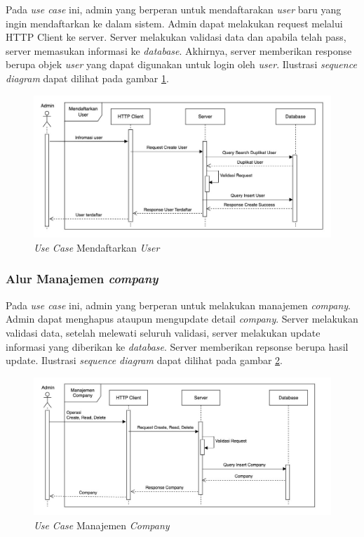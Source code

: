 Pada \textit{use case} ini, admin yang berperan untuk mendaftarakan \textit{user} baru yang ingin mendaftarkan ke dalam sistem. Admin dapat melakukan request melalui HTTP Client ke server. Server melakukan validasi data dan apabila telah pass, server memasukan informasi ke \textit{database}. Akhirnya, server memberikan response berupa objek \textit{user} yang dapat digunakan untuk login oleh \textit{user}. Ilustrasi \textit{sequence diagram} dapat dilihat pada gambar \ref{fig:usecase-02}.

\begin{figure}[ht]
  \centering
  \includegraphics[width=1\textwidth]{resources/chapter-3/usecase/uc-02.jpg}
  \caption{\textit{Use Case} Mendaftarkan \textit{User}}
  \label{fig:usecase-02}
\end{figure}

\subsubsection{Alur Manajemen \textit{company}}

Pada \textit{use case} ini, admin yang berperan untuk melakukan manajemen \textit{company}. Admin dapat menghapus ataupun mengupdate detail \textit{company}. Server melakukan validasi data, setelah melewati seluruh validasi, server melakukan update informasi yang diberikan ke \textit{database}. Server memberikan repsonse berupa hasil update. Ilustrasi \textit{sequence diagram} dapat dilihat pada gambar \ref{fig:usecase-03}.

\begin{figure}[ht]
  \centering
  \includegraphics[width=1\textwidth]{resources/chapter-3/usecase/uc-03.jpg}
  \caption{\textit{Use Case} Manajemen \textit{Company}}
  \label{fig:usecase-03}
\end{figure}

